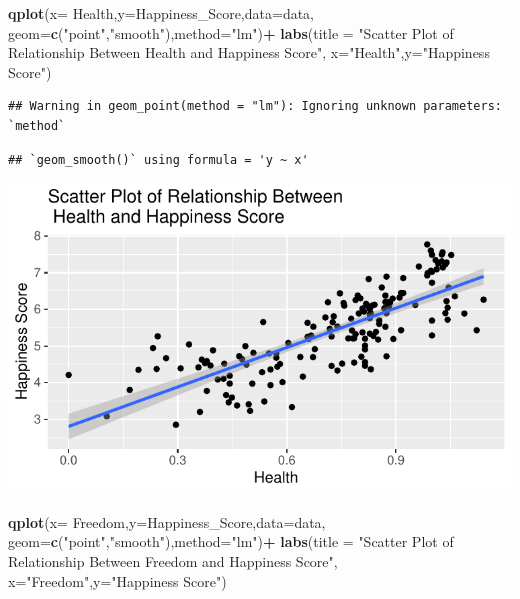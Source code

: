 \documentclass[
  11pt,
]{article}
\newenvironment{Shaded}{\begin{snugshade}}{\end{snugshade}}
\newcommand{\AttributeTok}[1]{\textcolor[rgb]{0.13,0.29,0.53}{#1}}
\newcommand{\FunctionTok}[1]{\textcolor[rgb]{0.13,0.29,0.53}{\textbf{#1}}}
\newcommand{\NormalTok}[1]{#1}
\newcommand{\SpecialCharTok}[1]{\textcolor[rgb]{0.81,0.36,0.00}{\textbf{#1}}}
\newcommand{\StringTok}[1]{\textcolor[rgb]{0.31,0.60,0.02}{#1}}
\begin{document}
\begin{Shaded}
\begin{Highlighting}[]
\FunctionTok{qplot}\NormalTok{(}\AttributeTok{x=}\NormalTok{ Health,}\AttributeTok{y=}\NormalTok{Happiness\_Score,}\AttributeTok{data=}\NormalTok{data,}
 \AttributeTok{geom=}\FunctionTok{c}\NormalTok{(}\StringTok{"point"}\NormalTok{,}\StringTok{"smooth"}\NormalTok{),}\AttributeTok{method=}\StringTok{"lm"}\NormalTok{)}\SpecialCharTok{+}
 \FunctionTok{labs}\NormalTok{(}\AttributeTok{title =}
 \StringTok{"Scatter Plot of Relationship Between}
\StringTok{ Health and Happiness Score"}\NormalTok{,}
 \AttributeTok{x=}\StringTok{"Health"}\NormalTok{,}\AttributeTok{y=}\StringTok{"Happiness Score"}\NormalTok{)}
\end{Highlighting}
\end{Shaded}

\begin{verbatim}
## Warning in geom_point(method = "lm"): Ignoring unknown parameters: `method`
\end{verbatim}

\begin{verbatim}
## `geom_smooth()` using formula = 'y ~ x'
\end{verbatim}

\begin{center}\includegraphics[width=0.7\linewidth]{Group_project_2_files/figure-latex/unnamed-chunk-6-1} \end{center}

\begin{Shaded}
\begin{Highlighting}[]
\FunctionTok{qplot}\NormalTok{(}\AttributeTok{x=}\NormalTok{ Freedom,}\AttributeTok{y=}\NormalTok{Happiness\_Score,}\AttributeTok{data=}\NormalTok{data,}
 \AttributeTok{geom=}\FunctionTok{c}\NormalTok{(}\StringTok{"point"}\NormalTok{,}\StringTok{"smooth"}\NormalTok{),}\AttributeTok{method=}\StringTok{"lm"}\NormalTok{)}\SpecialCharTok{+}
 \FunctionTok{labs}\NormalTok{(}\AttributeTok{title =}
 \StringTok{"Scatter Plot of Relationship Between}
\StringTok{ Freedom and Happiness Score"}\NormalTok{,}
 \AttributeTok{x=}\StringTok{"Freedom"}\NormalTok{,}\AttributeTok{y=}\StringTok{"Happiness Score"}\NormalTok{)}
\end{Highlighting}
\end{Shaded}
\end{document}
